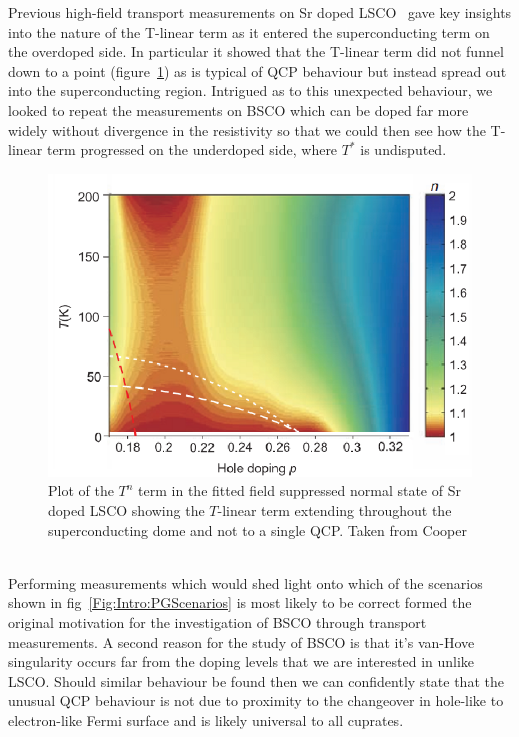 Previous high-field transport measurements on Sr doped \ac{LSCO}~\cite{Cooper2009} gave key insights into the nature of the T-linear term as it entered the superconducting term on the overdoped side. In particular it showed that the T-linear term did not funnel down to a point (figure~\ref{Fig:Intro:CooperTLinear}) as is typical of \ac{QCP} behaviour but instead spread out into the superconducting region. Intrigued as to this unexpected behaviour, we looked to repeat the measurements on \ac{BSCO} which can be doped far more widely without divergence in the resistivity so that we could then see how the T-linear term progressed on the underdoped side, where $T^*$ is undisputed.
\begin{figure}[htbp]
    \begin{center}
        \includegraphics[scale=0.8]{Chapter-Introduction/Figures/CooperTLinear/CooperTLinear}
        \caption{Plot of the $T^n$ term in the fitted field suppressed normal state of Sr doped \ac{LSCO} showing the $T$-linear term extending throughout the superconducting dome and not to a single \ac{QCP}. Taken from Cooper \etal~\cite{Cooper2009}}
        \label{Fig:Intro:CooperTLinear}
    \end{center}
\end{figure}
Performing measurements which would shed light onto which of the scenarios shown in fig~\ref{Fig:Intro:PGScenarios} is most likely to be correct formed the original motivation for the investigation of \ac{BSCO} through transport measurements. A second reason for the study of \ac{BSCO} is that it's van-Hove singularity occurs far from the doping levels that we are interested in unlike \ac{LSCO}. Should similar behaviour be found then we can confidently state that the unusual \ac{QCP} behaviour is not due to proximity to the changeover in hole-like to electron-like Fermi surface and is likely universal to all cuprates. 

